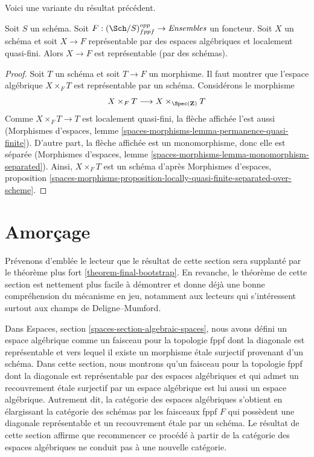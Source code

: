 \noindent
Voici une variante du résultat précédent.

\begin{lemma}
\label{lemma-bootstrap-locally-quasi-finite}
Soit $S$ un schéma. Soit $F : (\Sch/S)_{fppf}^{opp} \to \textit{Ensembles}$ un
foncteur. Soit $X$ un schéma et soit $X \to F$ représentable par des espaces
algébriques et localement quasi-fini. Alors $X \to F$ est représentable
(par des schémas).
\end{lemma}

\begin{proof}
Soit $T$ un schéma et soit $T \to F$ un morphisme. Il faut montrer que
l'espace algébrique $X \times_F T$ est représentable par un schéma. Considérons
le morphisme
$$
X \times_F T  \longrightarrow X \times_{\Spec(\mathbf{Z})} T
$$
Comme $X \times_F T \to T$ est localement quasi-fini, la flèche affichée
l'est aussi (Morphismes d'espaces, lemme
\ref{spaces-morphisms-lemma-permanence-quasi-finite}).
D'autre part, la flèche affichée est un monomorphisme,
donc elle est séparée (Morphismes d'espaces, lemme
\ref{spaces-morphisms-lemma-monomorphism-separated}).
Ainsi, $X \times_F T$ est un schéma d'après Morphismes d'espaces, proposition
\ref{spaces-morphisms-proposition-locally-quasi-finite-separated-over-scheme}.
\end{proof}











\section{Amorçage}
\label{section-bootstrap}

\noindent
Prévenons d'emblée le lecteur que le résultat de cette section sera
supplanté par le théorème plus fort
\ref{theorem-final-bootstrap}.
En revanche, le théorème de cette section est nettement plus facile à
démontrer et donne déjà une bonne compréhension du mécanisme en jeu,
notamment aux lecteurs qui s'intéressent surtout aux champs de
Deligne--Mumford.

\medskip\noindent
Dans
Espaces, section \ref{spaces-section-algebraic-spaces},
nous avons défini un espace algébrique comme un faisceau pour la topologie fppf
dont la diagonale est représentable et vers lequel il existe un morphisme étale
surjectif provenant d'un schéma. Dans cette section, nous montrons qu'un
faisceau pour la topologie fppf dont la diagonale est représentable par des espaces
algébriques et qui admet un recouvrement étale surjectif par un espace algébrique
est lui aussi un espace algébrique.
Autrement dit, la catégorie des espaces algébriques s'obtient en élargissant la
catégorie des schémas par les faisceaux fppf $F$ qui possèdent une diagonale
représentable et un recouvrement étale par un schéma. Le
résultat de cette section affirme que recommencer ce procédé à partir de
la catégorie des espaces algébriques ne conduit pas à une nouvelle catégorie.

